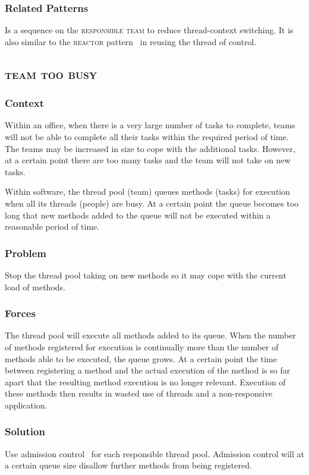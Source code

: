 \documentclass[prodmode]{style/acmlarge}
\begin{document}
\subsubsection*{Related Patterns} Is a sequence on the \textsc{responsible team}
to reduce thread-context switching.  It is also similar to the \textsc{reactor}
pattern~\cite{reactor} in reusing the thread of control.



\subsection{\textsc{\textbf{team too busy}}}

\subsubsection*{Context} Within an office, when there is a very large number of
tasks to complete, teams will not be able to complete all their tasks within the
required period of time.  The teams may be increased in size to cope with the
additional tasks.  However, at a certain point there are too many tasks and the
team will not take on new tasks.

Within software, the thread pool (team) queues methods (tasks) for execution
when all its threads (people) are busy.  At a certain point the queue becomes
too long that new methods added to the queue will not be executed within a
reasonable period of time.

\subsubsection*{\textbf{Problem}} Stop the thread pool taking on new methods so it may
cope with the current load of methods.

\subsubsection*{Forces} The thread pool will execute all methods added to its
queue.  When the number of methods registered for execution is continually more
than the number of methods able to be executed, the queue grows.  At a certain
point the time between registering a method and the actual execution of the
method is so far apart that the resulting method execution is no longer
relevant.  Execution of these methods then results in wasted use of threads and
a non-responsive application.

\subsubsection*{\textbf{Solution}} Use admission control~\cite{seda} for each responsible
thread pool.  Admission control will at a certain queue size disallow further
methods from being registered.
\end{document}
